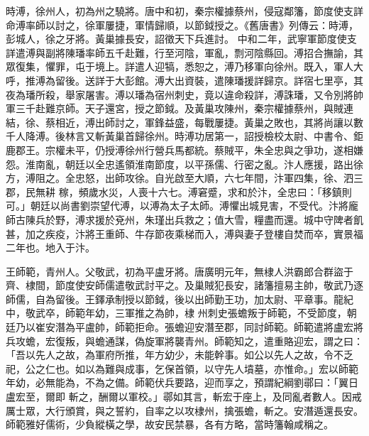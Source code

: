 \begin{pinyinscope}
 時溥，徐州人，初為州之驍將。唐中和初，秦宗權據蔡州，侵寇鄰籓，節度使支詳命溥率師以討之，徐軍屢捷，軍情歸順，以節鉞授之。《舊唐書》列傳云：時溥，彭城人，徐之牙將。黃巢據長安，詔徵天下兵進討。
 中和二年，武寧軍節度使支詳遣溥與副將陳璠率師五千赴難，行至河陰，軍亂，剽河陰縣回。溥招合撫諭，其眾復集，懼罪，屯于境上。詳遣人迎犒，悉恕之，溥乃移軍向徐州。既入，軍人大呼，推溥為留後。送詳于大彭館。溥大出資裝，遣陳璠援詳歸京。詳宿七里亭，其夜為璠所殺，舉家屠害。溥以璠為宿州刺史，竟以違命殺詳，溥誅璠，又令別將帥軍三千赴難京師。天子還宮，授之節鉞。及黃巢攻陳州，秦宗權據蔡州，與賊連結，徐、蔡相近，溥出師討之，軍鋒益盛，每戰屢捷。黃巢之敗也，其將尚讓以數千人降溥。後林言又斬黃巢首歸徐州。時溥功居第一，詔授檢校太尉、中書令、鉅鹿郡王。宗權未平，仍授溥徐州行營兵馬都統。蔡賊平，朱全忠與之爭功，遂相嫌怨。淮南亂，朝廷以全忠遙領淮南節度，以平孫儒、行密之亂。汴人應援，路出徐方，溥阻之。全忠怒，出師攻徐。自光啟至大順，六七年間，汴軍四集，徐、泗三郡，民無耕
 稼，頻歲水災，人喪十六七。溥窘蹙，求和於汴，全忠曰：「移鎮則可。」朝廷以尚書劉崇望代溥，以溥為太子太師。溥懼出城見害，不受代。汴將龐師古陳兵於野，溥求援於兗州，朱瑾出兵救之；值大雪，糧盡而還。城中守陴者飢甚，加之疾疫，汴將王重師、牛存節夜乘梯而入，溥與妻子登樓自焚而卒，實景福二年也。地入于汴。



 王師範，青州人。父敬武，初為平盧牙將。唐廣明元年，無棣人洪霸郎合群盜于齊、棣間，節度使安師儒遣敬武討平之。及巢賊犯長安，諸籓擅易主帥，敬武乃逐師儒，自為留後。王鐸承制授以節鉞，後以出師勤王功，加太尉、平章事。龍紀中，敬武卒，師範年幼，三軍推之為帥，棣
 州刺史張蟾叛于師範，不受節度，朝廷乃以崔安潛為平盧帥，師範拒命。張蟾迎安潛至郡，同討師範。師範遣將盧宏將兵攻蟾，宏復叛，與蟾通謀，偽旋軍將襲青州。師範知之，遣重賂迎宏，謂之曰：「吾以先人之故，為軍府所推，年方幼少，未能幹事。如公以先人之故，令不乏祀，公之仁也。如以為難與成事，乞保首領，以守先人墳墓，亦惟命。」宏以師範年幼，必無能為，不為之備。師範伏兵要路，迎而享之，預謂紀綱劉鄩曰：「翼日盧宏至，爾即
 斬之，酬爾以軍校。」鄩如其言，斬宏于座上，及同亂者數人。因戒厲士眾，大行頒賞，與之誓約，自率之以攻棣州，擒張蟾，斬之。安潛遁還長安。師範雅好儒術，少負縱橫之學，故安民禁暴，各有方略，當時籓翰咸稱之。




\end{pinyinscope}
